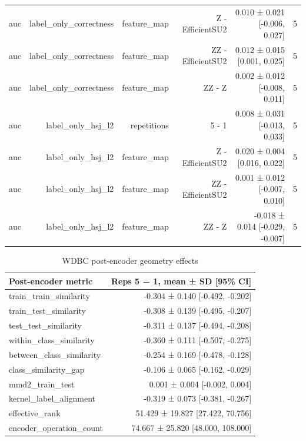 \begin{table}
\begin{tabular}{lrrrrr}
auc & label\_only\_correctness & feature\_map & Z - EfficientSU2 & 0.010 ± 0.021 [-0.006, 0.027] & 5 \\
auc & label\_only\_correctness & feature\_map & ZZ - EfficientSU2 & 0.012 ± 0.015 [0.001, 0.025] & 5 \\
auc & label\_only\_correctness & feature\_map & ZZ - Z & 0.002 ± 0.012 [-0.008, 0.011] & 5 \\
auc & label\_only\_hsj\_l2 & repetitions & 5 - 1 & 0.008 ± 0.031 [-0.013, 0.033] & 5 \\
auc & label\_only\_hsj\_l2 & feature\_map & Z - EfficientSU2 & 0.020 ± 0.004 [0.016, 0.022] & 5 \\
auc & label\_only\_hsj\_l2 & feature\_map & ZZ - EfficientSU2 & 0.001 ± 0.012 [-0.007, 0.010] & 5 \\
auc & label\_only\_hsj\_l2 & feature\_map & ZZ - Z & -0.018 ± 0.014 [-0.029, -0.007] & 5 \\
\bottomrule
\end{tabular}
\end{table}


\begin{table}
\caption{WDBC post-encoder geometry effects}
\label{tab:satml_wdbc_geometry}
\begin{tabular}{lr}
\toprule
Post-encoder metric & Reps 5 − 1, mean ± SD [95\% CI] \\
\midrule
train\_train\_similarity & -0.304 ± 0.140 [-0.492, -0.202] \\
train\_test\_similarity & -0.308 ± 0.139 [-0.495, -0.207] \\
test\_test\_similarity & -0.311 ± 0.137 [-0.494, -0.208] \\
within\_class\_similarity & -0.360 ± 0.111 [-0.507, -0.275] \\
between\_class\_similarity & -0.254 ± 0.169 [-0.478, -0.128] \\
class\_similarity\_gap & -0.106 ± 0.065 [-0.162, -0.029] \\
mmd2\_train\_test & 0.001 ± 0.004 [-0.002, 0.004] \\
kernel\_label\_alignment & -0.319 ± 0.073 [-0.381, -0.267] \\
effective\_rank & 51.429 ± 19.827 [27.422, 70.756] \\
encoder\_operation\_count & 74.667 ± 25.820 [48.000, 108.000] \\
\bottomrule
\end{tabular}
\end{table}


